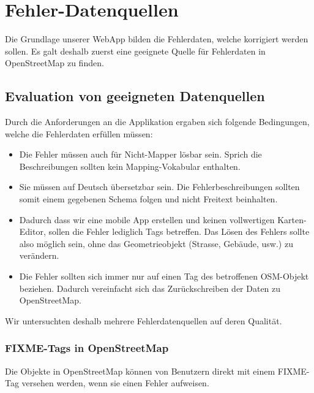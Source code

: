 \chapter{Fehler-Datenquellen}
\label{datenquellen}
Die Grundlage unserer WebApp bilden die Fehlerdaten, welche korrigiert werden sollen.
Es galt deshalb zuerst eine geeignete Quelle für Fehlerdaten in OpenStreetMap zu finden.

\section{Evaluation von geeigneten Datenquellen}
Durch die Anforderungen an die Applikation ergaben sich folgende Bedingungen, welche die Fehlerdaten erfüllen müssen:

\begin{itemize}
\item Die Fehler müssen auch für Nicht-Mapper lösbar sein. Sprich die Beschreibungen sollten kein Mapping-Vokabular enthalten.
\item Sie müssen auf Deutsch übersetzbar sein. Die Fehlerbeschreibungen sollten somit einem gegebenen Schema folgen und nicht Freitext beinhalten.
\item Dadurch dass wir eine mobile App erstellen und keinen vollwertigen Karten-Editor, sollen die Fehler lediglich Tags betreffen. Das Lösen des Fehlers sollte also möglich sein, ohne das Geometrieobjekt (Strasse, Gebäude, usw.) zu verändern.
\item Die Fehler sollten sich immer nur auf einen Tag des betroffenen OSM-Objekt beziehen. Dadurch vereinfacht sich das Zurückschreiben der Daten zu OpenStreetMap.
\end{itemize}

Wir untersuchten deshalb mehrere Fehlerdatenquellen auf deren Qualität.

\subsection{FIXME-Tags in OpenStreetMap}
Die Objekte in OpenStreetMap können von Benutzern direkt mit einem FIXME-Tag versehen werden, wenn sie einen Fehler aufweisen.

